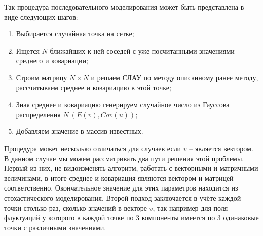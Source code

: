 Так процедура последовательного моделирования может быть представлена в виде следующих шагов: 

\begin{enumerate}
    \item Выбирается случайная точка на сетке;
    \item Ищется $N$ ближайших к ней соседей с уже посчитанными значениями среднего и ковариации;
    \item Строим матрицу $N \times N$ и решаем СЛАУ по методу описанному ранее методу, рассчитываем среднее и ковариацию в этой точке;
    \item Зная среднее и ковариацию генерируем случайное число из Гауссова распределения $N~(E(v), Cov(u))$;
    \item Добавляем значение в массив известных.
\end{enumerate}

Процедура может несколько отличаться для случаев если $v$ -- является вектором. В данном случае мы можем рассматривать два пути решения этой проблемы. Первый из них, не видоизменять алгоритм, работать с векторными и матричными величинами, в итоге среднее и ковариация являются вектором и матрицей соответственно. Окончательное значение для этих параметров находится из стохастического моделирования. Второй подход заключается в учёте каждой точки столько раз, сколько значений в векторе $v$, так например для поля флуктуаций у которого в каждой точке по 3 компоненты имеется по 3 одинаковые точки с различными значениями.
